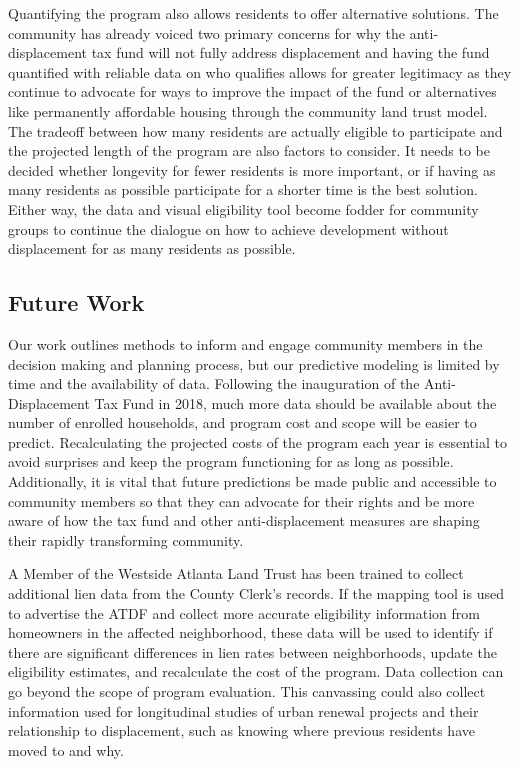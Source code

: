 \documentclass{acm_proc_article-sp}
\begin{document}
Quantifying the program also allows residents to offer alternative solutions. The community has already voiced two primary concerns for why the anti-displacement tax fund will not fully address displacement and having the fund quantified with reliable data on who qualifies allows for greater legitimacy as they continue to advocate for ways to improve the impact of the fund or alternatives like permanently affordable housing through the community land trust model. The tradeoff between how many residents are actually eligible to participate and the projected length of the program are also factors to consider. It needs to be decided whether longevity for fewer residents is more important, or if having as many residents as possible participate for a shorter time is the best solution. Either way, the data and visual eligibility tool become fodder for community groups to continue the dialogue on how to achieve development without displacement for as many residents as possible.

\subsection{Future Work}

Our work outlines methods to inform and engage community members in the decision making and planning process, but our predictive modeling is limited by time and the availability of data. Following the inauguration of the Anti-Displacement Tax Fund in 2018, much more data should be available about the number of enrolled households, and program cost and scope will be easier to predict. Recalculating the projected costs of the program each year is essential to avoid surprises and keep the program functioning for as long as possible. Additionally, it is vital that future predictions be made public and accessible to community members so that they can advocate for their rights and be more aware of how the tax fund and other anti-displacement measures are shaping their rapidly transforming community.

A Member of the Westside Atlanta Land Trust has been trained to collect additional lien data from the County Clerk's records. If the mapping tool is used to advertise the ATDF and collect more accurate eligibility information from homeowners in the affected neighborhood, these data will be used to identify if there are significant differences in lien rates between neighborhoods, update the eligibility estimates, and recalculate the cost of the program. Data collection can go beyond the scope of program evaluation. This canvassing could also collect information used for longitudinal studies of urban renewal projects and their relationship to displacement, such as knowing where previous residents have moved to and why.
\end{document}
